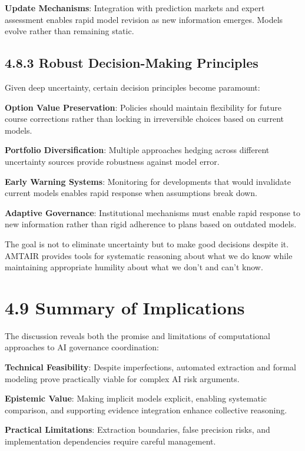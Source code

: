 \documentclass[
  11pt,
  letterpaper,
]{book}
\begin{document}
\textbf{Update Mechanisms}: Integration with prediction markets and
expert assessment enables rapid model revision as new information
emerges. Models evolve rather than remaining static.

\subsection{4.8.3 Robust Decision-Making
Principles}\label{sec-robust-principles}

Given deep uncertainty, certain decision principles become paramount:

\textbf{Option Value Preservation}: Policies should maintain flexibility
for future course corrections rather than locking in irreversible
choices based on current models.

\textbf{Portfolio Diversification}: Multiple approaches hedging across
different uncertainty sources provide robustness against model error.

\textbf{Early Warning Systems}: Monitoring for developments that would
invalidate current models enables rapid response when assumptions break
down.

\textbf{Adaptive Governance}: Institutional mechanisms must enable rapid
response to new information rather than rigid adherence to plans based
on outdated models.

The goal is not to eliminate uncertainty but to make good decisions
despite it. AMTAIR provides tools for systematic reasoning about what we
do know while maintaining appropriate humility about what we don't and
can't know.

\section{4.9 Summary of Implications}\label{sec-implications-summary}

The discussion reveals both the promise and limitations of computational
approaches to AI governance coordination:

\textbf{Technical Feasibility}: Despite imperfections, automated
extraction and formal modeling prove practically viable for complex AI
risk arguments.

\textbf{Epistemic Value}: Making implicit models explicit, enabling
systematic comparison, and supporting evidence integration enhance
collective reasoning.

\textbf{Practical Limitations}: Extraction boundaries, false precision
risks, and implementation dependencies require careful management.
\end{document}
